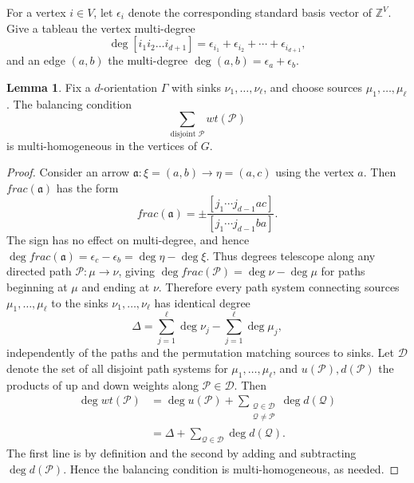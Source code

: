 \documentclass[11pt,letterpaper]{amsart}
\theoremstyle{definition}
\newtheorem{lemma}{Lemma}
\begin{document}
For a vertex $i\in V$, let $\epsilon_i$ denote the corresponding standard basis vector of $\mathbb{Z}^V$.  Give a tableau the vertex multi-degree
\begin{equation*}
    \deg[i_1 i_2 \dots i_{d+1}] = \epsilon_{i_1} + \epsilon_{i_2} + \cdots + \epsilon_{i_{d+1}},
\end{equation*}
and an edge $(a,b)$ the multi-degree $\deg(a,b) = \epsilon_a + \epsilon_b$.

\begin{lemma}\label{lemma:balancing-multihomogeneous-new}
    Fix a $d$-orientation $\Gamma$ with sinks $\nu_1,\dots,\nu_\ell$, and choose sources $\mu_1,\dots,\mu_\ell$. The balancing condition
    \begin{equation*}
        \sum_{\text{disjoint }\mathcal{P}} wt(\mathcal{P})
    \end{equation*}
    is multi-homogeneous in the vertices of $G$.
\end{lemma}

\begin{proof}
    Consider an arrow $\mathfrak{a}: \xi=(a,b) \longrightarrow \eta=(a,c)$ using the vertex $a$. Then $frac(\mathfrak{a})$ has the form
    \begin{equation*}
        frac(\mathfrak{a}) = \pm \frac{[j_1 \cdots j_{d-1} a c]}{[j_1 \cdots j_{d-1} b a]}.
    \end{equation*}
    The sign has no effect on multi-degree, and hence $\deg frac(\mathfrak{a}) = \epsilon_c - \epsilon_b = \deg \eta - \deg \xi$. Thus degrees telescope along any directed path $\mathcal P:\mu\to\nu$, giving $\deg frac(\mathcal{P}) = \deg \nu - \deg \mu$ for paths beginning at $\mu$ and ending at $\nu$. Therefore every path system connecting sources $\mu_1,\dots,\mu_\ell$ to the sinks $\nu_1,\dots,\nu_\ell$ has identical degree
    \begin{equation*}
        \Delta = \sum_{j=1}^\ell \deg \nu_j - \sum_{j=1}^\ell \deg \mu_j,
    \end{equation*}
    independently of the paths and the permutation matching sources to sinks. Let $\mathcal{D}$ denote the set of all disjoint path systems for $\mu_1,\dots,\mu_\ell$, and $u(\mathcal{P}), d(\mathcal{P})$ the products of up and down weights along $\mathcal{P} \in \mathcal{D}$. Then
    \begin{align*}
        \deg wt(\mathcal{P}) &= \deg u(\mathcal{P}) + \sum_{\substack{\mathcal{Q} \in \mathcal{D}\\ \mathcal{Q} \neq \mathcal{P}}} \deg d(\mathcal{Q}) \\
        &= \Delta + \sum_{\mathcal{Q} \in \mathcal{D}} \deg d(\mathcal{Q}).
    \end{align*}
    The first line is by definition and the second by adding and subtracting $\deg d(\mathcal{P})$. Hence the balancing condition is multi-homogeneous, as needed.
\end{proof}
\end{document}
